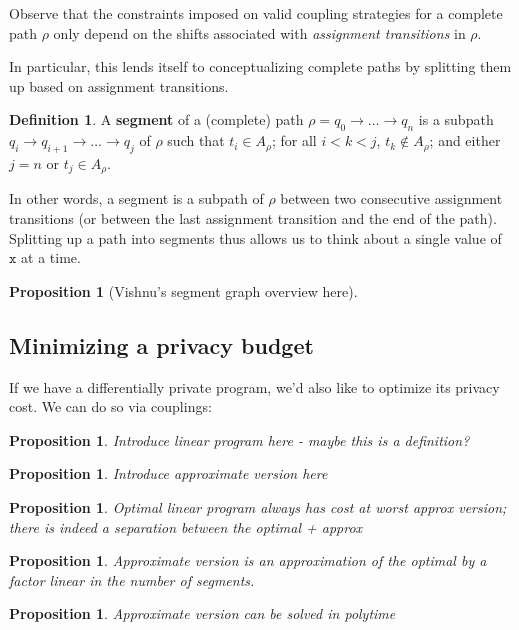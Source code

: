 \documentclass[12pt]{article}
\newtheorem{prop}[thm]{Proposition}
\theoremstyle{definition}
\newtheorem{defn}[thm]{Definition}
\begin{document}
Observe that the constraints imposed on valid coupling strategies for a complete path $\rho$ only depend on the shifts associated with \textit{assignment transitions} in $\rho$. 

In particular, this lends itself to conceptualizing complete paths by splitting them up based on assignment transitions. 

\begin{defn}
    A \textbf{segment} of a (complete) path $\rho = q_0\to\ldots\to q_n$ is a subpath $q_i \to q_{i+1}\to \ldots \to q_j$ of $\rho$ such that $t_i \in A_\rho$; for all $i<k<j$, $t_k \notin A_\rho$; and either $j=n$ or $t_j \in A_\rho$.
\end{defn}

In other words, a segment is a subpath of $\rho$ between two consecutive assignment transitions (or between the last assignment transition and the end of the path). Splitting up a path into segments thus allows us to think about a single value of $\texttt{x}$ at a time.

\begin{prop}
    [Vishnu's segment graph overview here]
\end{prop}

\subsection{Minimizing a privacy budget}

If we have a differentially private program, we'd also like to optimize its privacy cost. We can do so via couplings: 

\begin{prop}
    Introduce linear program here - maybe this is a definition?
\end{prop}

\begin{prop}
    Introduce approximate version here
\end{prop}

\begin{prop}
    Optimal linear program always has cost at worst approx version; there is indeed a separation between the optimal + approx
\end{prop}

\begin{prop}
    Approximate version is an approximation of the optimal by a factor linear in the number of segments. 
\end{prop}

\begin{prop}
    Approximate version can be solved in polytime
\end{prop}
\end{document}
